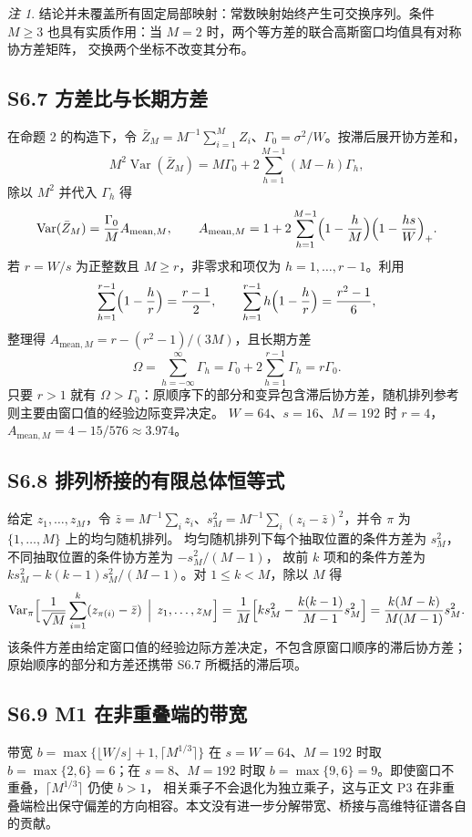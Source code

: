 \documentclass[UTF8,zihao=-4]{ctexart}
\theoremstyle{remark}
\newtheorem{remark}{注}
\begin{document}
\begin{remark}
结论并未覆盖所有固定局部映射：常数映射始终产生可交换序列。条件 $M\ge3$ 也具有实质作用：当 $M=2$ 时，两个等方差的联合高斯窗口均值具有对称协方差矩阵，
交换两个坐标不改变其分布。
\end{remark}

\subsection*{S6.7 方差比与长期方差}
在命题 2 的构造下，令 $\bar Z_M=M^{-1}\sum_{i=1}^MZ_i$、$\Gamma_0=\sigma^2/W$。按滞后展开协方差和，
\[
 M^2\operatorname{Var}(\bar Z_M)=M\Gamma_0+2\sum_{h=1}^{M-1}(M-h)\Gamma_h ,
\]
除以 $M^2$ 并代入 $\Gamma_h$ 得
\[
 \operatorname{Var}(\bar Z_M)=\frac{\Gamma_0}{M}A_{\mathrm{mean},M},
 \qquad
 A_{\mathrm{mean},M}=1+2\sum_{h=1}^{M-1}\Bigl(1-\frac hM\Bigr)\Bigl(1-\frac{hs}{W}\Bigr)_+ .
\]
若 $r=W/s$ 为正整数且 $M\ge r$，非零求和项仅为 $h=1,\ldots,r-1$。利用
\[
 \sum_{h=1}^{r-1}\Bigl(1-\frac hr\Bigr)=\frac{r-1}{2},
 \qquad
 \sum_{h=1}^{r-1}h\Bigl(1-\frac hr\Bigr)=\frac{r^2-1}{6},
\]
整理得 $A_{\mathrm{mean},M}=r-(r^2-1)/(3M)$，且长期方差
\[
 \Omega=\sum_{h=-\infty}^{\infty}\Gamma_h=\Gamma_0+2\sum_{h=1}^{r-1}\Gamma_h=r\Gamma_0 .
\]
只要 $r>1$ 就有 $\Omega>\Gamma_0$：原顺序下的部分和变异包含滞后协方差，随机排列参考则主要由窗口值的经验边际变异决定。
$W=64$、$s=16$、$M=192$ 时 $r=4$，$A_{\mathrm{mean},M}=4-15/576\approx3.974$。

\subsection*{S6.8 排列桥接的有限总体恒等式}
给定 $z_1,\ldots,z_M$，令 $\bar z=M^{-1}\sum_iz_i$、$s_M^2=M^{-1}\sum_i(z_i-\bar z)^2$，并令 $\pi$ 为 $\{1,\ldots,M\}$ 上的均匀随机排列。
均匀随机排列下每个抽取位置的条件方差为 $s_M^2$，不同抽取位置的条件协方差为 $-s_M^2/(M-1)$，
故前 $k$ 项和的条件方差为 $k s_M^2-k(k-1)s_M^2/(M-1)$。对 $1\le k<M$，除以 $M$ 得
\[
 \operatorname{Var}_{\pi}\Bigl[\frac1{\sqrt M}\sum_{i=1}^k(z_{\pi(i)}-\bar z)\,\Bigm|\,z_1,\ldots,z_M\Bigr]
 =\frac1M\Bigl[k s_M^2-\frac{k(k-1)}{M-1}s_M^2\Bigr]
 =\frac{k(M-k)}{M(M-1)}s_M^2 .
\]
该条件方差由给定窗口值的经验边际方差决定，不包含原窗口顺序的滞后协方差；
原始顺序的部分和方差还携带 S6.7 所概括的滞后项。

\subsection*{S6.9 M1 在非重叠端的带宽}
带宽 $b=\max\{\lfloor W/s\rfloor+1,\lceil M^{1/3}\rceil\}$ 在 $s=W=64$、$M=192$ 时取
$b=\max\{2,6\}=6$；在 $s=8$、$M=192$ 时取 $b=\max\{9,6\}=9$。即使窗口不重叠，$\lceil M^{1/3}\rceil$ 仍使 $b>1$，
相关乘子不会退化为独立乘子，这与正文 P3 在非重叠端检出保守偏差的方向相容。本文没有进一步分解带宽、桥接与高维特征谱各自的贡献。
\end{document}
